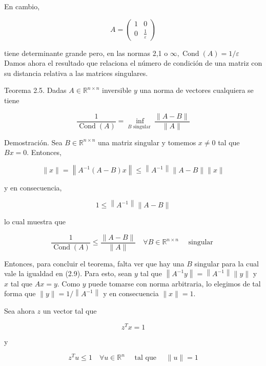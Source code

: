 \documentclass[10pt]{book}
\begin{document}
En cambio,

$$
A=\left(\begin{array}{cc}
1 & 0 \\
0 & \frac{1}{\varepsilon}
\end{array}\right)
$$

tiene determinante grande pero, en las normas 2,1 o $\infty, \operatorname{Cond}(A)=1 / \varepsilon$\\
Damos ahora el resultado que relaciona el número de condición de una matriz con su distancia relativa a las matrices singulares.

Teorema 2.5. Dadas $A \in \mathbb{R}^{n \times n}$ inversible $y$ una norma de vectores cualquiera se tiene

$$
\frac{1}{\operatorname{Cond}(A)}=\inf _{B \text { singular }} \frac{\|A-B\|}{\|A\|}
$$

Demostración. Sea $B \in \mathbb{R}^{n \times n}$ una matriz singular y tomemos $x \neq 0$ tal que $B x=0$. Entonces,

$$
\|x\|=\left\|A^{-1}(A-B) x\right\| \leq\left\|A^{-1}\right\|\|A-B\|\|x\|
$$

y en consecuencia,

$$
1 \leq\left\|A^{-1}\right\|\|A-B\|
$$

lo cual muestra que


\begin{equation*}
\frac{1}{\operatorname{Cond}(A)} \leq \frac{\|A-B\|}{\|A\|} \quad \forall B \in \mathbb{R}^{n \times n} \quad \text { singular } \tag{2.9}
\end{equation*}


Entonces, para concluir el teorema, falta ver que hay una $B$ singular para la cual vale la igualdad en (2.9). Para esto, sean $y$ tal que $\left\|A^{-1} y\right\|=\left\|A^{-1}\right\|\|y\|$ y $x$ tal que $A x=y$. Como $y$ puede tomarse con norma arbitraria, lo elegimos de tal forma que $\|y\|=1 /\left\|A^{-1}\right\|$ y en consecuencia $\|x\|=1$.

Sea ahora $z$ un vector tal que


\begin{equation*}
z^{T} x=1 \tag{2.10}
\end{equation*}


y


\begin{equation*}
z^{T} u \leq 1 \quad \forall u \in \mathbb{R}^{n} \quad \text { tal que } \quad\|u\|=1 \tag{2.11}
\end{equation*}
\end{document}
